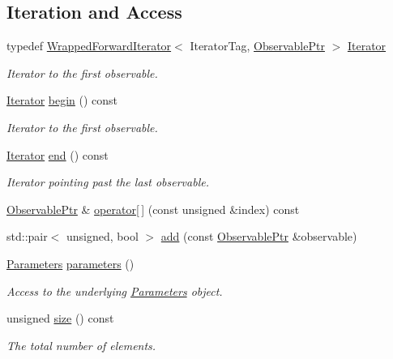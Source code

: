 \subsection*{Iteration and Access}
\label{_amgrp518e849dad280496b3dba5bda3151948}
 \begin{DoxyCompactItemize}
\item 
typedef \hyperlink{classeos_1_1WrappedForwardIterator}{WrappedForwardIterator}$<$ IteratorTag, \hyperlink{namespaceeos_a470e5dd806bd129080f1aa0c2954646f}{ObservablePtr} $>$ \hyperlink{classeos_1_1ObservableSet_ab19c0de83857e28065c2fe64b685a005}{Iterator}
\begin{DoxyCompactList}\small\item\em Iterator to the first observable. \item\end{DoxyCompactList}\item 
\hyperlink{classeos_1_1WrappedForwardIterator}{Iterator} \hyperlink{classeos_1_1ObservableSet_a51791b1a8c6a1b8d3a90f8400d9e4140}{begin} () const 
\begin{DoxyCompactList}\small\item\em Iterator to the first observable. \item\end{DoxyCompactList}\item 
\hyperlink{classeos_1_1WrappedForwardIterator}{Iterator} \hyperlink{classeos_1_1ObservableSet_ab0fb90d7278f1d8c87f7755768ffd17c}{end} () const 
\begin{DoxyCompactList}\small\item\em Iterator pointing past the last observable. \item\end{DoxyCompactList}\item 
\hyperlink{namespaceeos_a470e5dd806bd129080f1aa0c2954646f}{ObservablePtr} \& \hyperlink{classeos_1_1ObservableSet_adb47f7f0d77ea9f922aa5c5259695136}{operator\mbox{[}$\,$\mbox{]}} (const unsigned \&index) const 
\item 
std::pair$<$ unsigned, bool $>$ \hyperlink{classeos_1_1ObservableSet_aca5c09236edf4270851d09bf5c582ad6}{add} (const \hyperlink{namespaceeos_a470e5dd806bd129080f1aa0c2954646f}{ObservablePtr} \&observable)
\item 
\hyperlink{classeos_1_1Parameters}{Parameters} \hyperlink{classeos_1_1ObservableSet_a910264f5f626496138f8bae63dcbfa82}{parameters} ()
\begin{DoxyCompactList}\small\item\em Access to the underlying \hyperlink{classeos_1_1Parameters}{Parameters} object. \item\end{DoxyCompactList}\item 
unsigned \hyperlink{classeos_1_1ObservableSet_ad14948c8f2421fc718f6ede0d9089cb0}{size} () const 
\begin{DoxyCompactList}\small\item\em The total number of elements. \item\end{DoxyCompactList}\end{DoxyCompactItemize}


